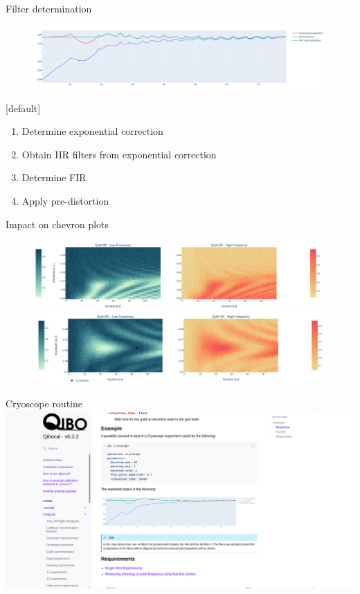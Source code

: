 \documentclass[aspectratio=169,10pt]{beamer}
\begin{document}
\begin{frame}{Filter determination}
  \begin{figure}
    \centering
    \includegraphics[width=\textwidth]{figures/B4_ringin.png}
  \end{figure}
  \vspace{0.5em}
  {[default]
    \begin{enumerate}[leftmargin=*, label=\arabic*.]    
      \item Determine exponential correction
      \item Obtain IIR filters from exponential correction
      \item Determine FIR
      \item Apply pre-distortion
    \end{enumerate}}
\end{frame}

\begin{frame}{Impact on chevron plots}
  \begin{figure}
    \centering
    \includegraphics[width=\textwidth]{figures/B2B4_nofilter.png}
    \vfill
    \includegraphics[width=\textwidth]{figures/B2B4.png}
  \end{figure}
\end{frame}

\begin{frame}{Cryoscope routine}
  \centering
  \includegraphics[height=\textheight]{figures/cryoscope_routine.png}
\end{frame}
\end{document}
